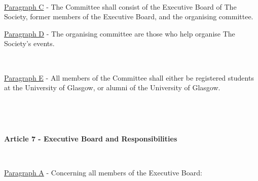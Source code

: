 ~

\underline{Paragraph C} - The Committee shall consist of the Executive
Board of The Society, former members of the Executive Board, and the
organising committee.

\underline{Paragraph D} - The organising committee are those who help
organise The Society's events.

~

\underline{Paragraph E} - All members of the Committee shall either be
registered students at the University of Glasgow, or
alumni of the University of Glasgow.

~

~

\large{\textbf{Article 7 - Executive Board and Responsibilities}}

~

\underline{Paragraph A} - Concerning all members of the Executive Board:

